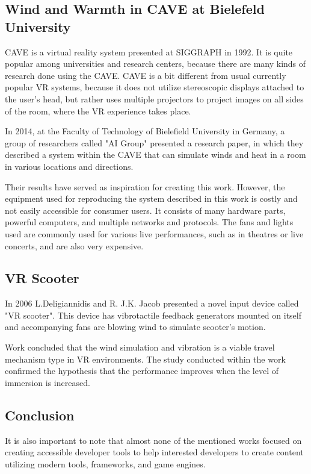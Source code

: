 \hypertarget{x-wind-and-warmth-in-cave-at-bielefeld-university}{\subsection{Wind and Warmth in CAVE at Bielefeld University}}
CAVE is a virtual reality system presented at SIGGRAPH in 1992.
It is quite popular among universities and research centers, because there are
many kinds of research done using the CAVE. CAVE is a bit different from
usual currently popular VR systems, because it does not utilize
stereoscopic displays attached to the user’s head, but rather uses multiple
projectors to project images on all sides of the room, where the
VR experience takes place.


In 2014, at the Faculty of Technology of Bielefield University in Germany,
a group of researchers called "AI Group" presented a research paper, in which
they described a system within the CAVE that can simulate winds
and heat in a room in various locations and directions.


Their results have served as inspiration for creating this work.
However, the equipment used for reproducing the system described in this work
is costly and not easily accessible for consumer users.
It consists of many hardware parts, powerful computers, and multiple
networks and protocols. The fans and lights used are commonly used
for various live performances, such as in theatres or live concerts, and are
also very expensive.


\hypertarget{x-vr-scooter}{\subsection{VR Scooter}}
In 2006 L.Deligiannidis and R. J.K. Jacob presented a novel input device called
"VR scooter". This device has vibrotactile feedback generators mounted on itself
and accompanying fans are blowing wind to simulate scooter’s motion.


Work concluded that the wind simulation and vibration is a viable travel
mechanism type in VR environments. The study conducted within
the work confirmed the hypothesis that the performance improves when the level of
immersion is increased.


\hypertarget{x-conclusion}{\subsection{Conclusion}}
It is also important to note that almost none of the mentioned works focused on
creating accessible developer tools to help interested developers to create
content utilizing modern tools, frameworks, and game engines.



